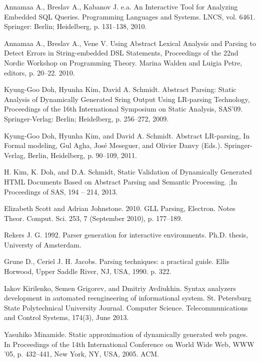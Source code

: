 \documentclass{sigplanconf}
\begin{document}
\begin{thebibliography}{}
\softraggedright

Annamaa A., Breslav A., Kabanov J. e.a. An Interactive Tool for Analyzing Embedded SQL Queries. Programming Languages and Systems. LNCS, vol. 6461. Springer: Berlin; Heidelberg, p. 131--138, 2010.

Annamaa A., Breslav A., Vene V. Using Abstract Lexical Analysis and Parsing to Detect Errors in String-embedded DSL Statements, Proceedings of the 22nd Nordic Workshop on Programming Theory. Marina Walden and Luigia Petre, editors, p. 20--22. 2010.

Kyung-Goo Doh, Hyunha Kim, David A. Schmidt. Abstract Parsing: Static Analysis of Dynamically Generated Sring Output Using LR-parsing Technology, Proceedings of the 16th International Symposium on Static Analysis, SAS’09. Springer-Verlag: Berlin; Heidelberg, p. 256--272, 2009.

Kyung-Goo Doh, Hyunha Kim, and David A. Schmidt. Abstract LR-parsing, In Formal modeling, Gul Agha, José Meseguer, and Olivier Danvy (Eds.). Springer-Verlag, Berlin, Heidelberg, p. 90--109, 2011.

H. Kim, K. Doh,  and D.A. Schmidt,  Static Validation of Dynamically Generated HTML Documents Based on Abstract Parsing and Semantic Processing.  ;In Proceedings of SAS, 194 -- 214, 2013.

Elizabeth Scott and Adrian Johnstone. 2010. GLL Parsing, Electron. Notes Theor. Comput. Sci. 253, 7 (September 2010), p. 177--189. 

Rekers J. G. 1992. Parser generation for interactive environments. Ph.D. thesis, Universty of Amsterdam.

Grune D., Ceriel J. H. Jacobs. Parsing techniques: a practical guide. Ellis Horwood, Upper Saddle River, NJ, USA, 1990. p. 322.

Iakov Kirilenko, Semen Grigorev, and Dmitriy Avdiukhin. Syntax analyzers development in automated reengineering of informational system.
St. Petersburg State Polytechnical University Journal. Computer Science. Telecommunications and Control Systems, 174(3), June 2013.

Yasuhiko Minamide. Static approximation of dynamically generated web pages. In Proceedings of the 14th International Conference on World
  Wide Web, WWW '05, p. 432--441, New York, NY, USA, 2005. ACM.


\end{thebibliography}
\end{document}
